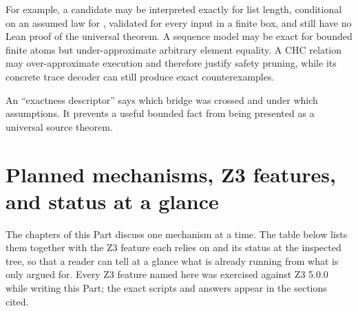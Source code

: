 \documentclass[10pt,letterpaper,oneside]{report}
\newcommand{\code}[1]{\texttt{\detokenize{#1}}}
\begin{document}
For example, a candidate may be interpreted exactly for list length, conditional on an assumed law for \code{List.reverse}, validated for every input in a finite box, and still have no Lean proof of the universal theorem. A sequence model may be exact for bounded finite atoms but under-approximate arbitrary element equality. A CHC relation may over-approximate execution and therefore justify safety pruning, while its concrete trace decoder can still produce exact counterexamples.

\begin{mentalmodel}
An ``exactness descriptor'' says which bridge was crossed and under which assumptions. It prevents a useful bounded fact from being presented as a universal source theorem.
\end{mentalmodel}
\section{Planned mechanisms, Z3 features, and status at a glance}
\label{sec:mechanism-status-table}

The chapters of this Part discuss one mechanism at a time. The table below lists them together with the Z3 feature each relies on and its status at the inspected tree, so that a reader can tell at a glance what is already running from what is only argued for. Every Z3 feature named here was exercised against Z3 5.0.0 while writing this Part; the exact scripts and answers appear in the sections cited.
\end{document}
